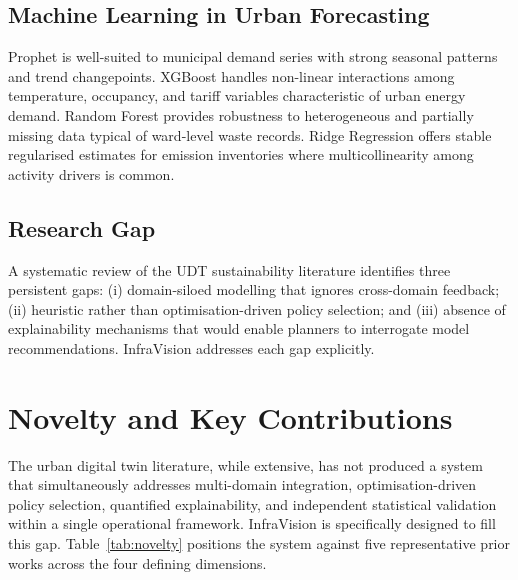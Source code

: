 \documentclass[conference]{IEEEtran}
\begin{document}
\subsection{Machine Learning in Urban Forecasting}

Prophet \cite{taylor2018} is well-suited to municipal demand series with
strong seasonal patterns and trend changepoints. XGBoost \cite{chen2016}
handles non-linear interactions among temperature, occupancy, and tariff
variables characteristic of urban energy demand. Random Forest provides
robustness to heterogeneous and partially missing data typical of
ward-level waste records. Ridge Regression offers stable regularised
estimates for emission inventories where multicollinearity among activity
drivers is common.

\subsection{Research Gap}

A systematic review of the UDT sustainability literature identifies three
persistent gaps: (i) domain-siloed modelling that ignores cross-domain
feedback; (ii) heuristic rather than optimisation-driven policy
selection; and (iii) absence of explainability mechanisms that would
enable planners to interrogate model recommendations. InfraVision
addresses each gap explicitly.

\section{Novelty and Key Contributions}
\label{sec:novelty}

The urban digital twin literature, while extensive, has not produced a
system that simultaneously addresses multi-domain integration,
optimisation-driven policy selection, quantified explainability, and
independent statistical validation within a single operational
framework. InfraVision is specifically designed to fill this gap.
Table~\ref{tab:novelty} positions the system against five representative
prior works across the four defining dimensions.
\end{document}

